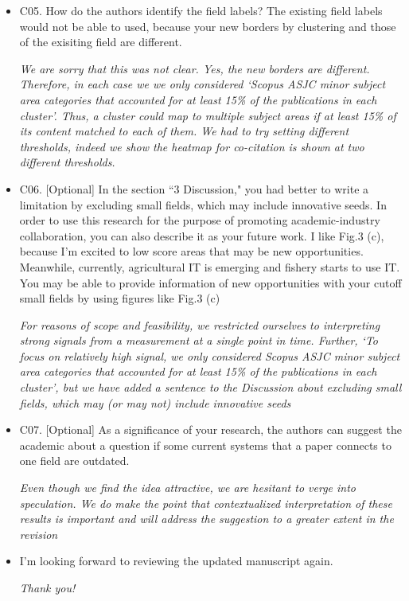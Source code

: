 \documentclass[11pt, oneside]{article}   	%
\begin{document}
\begin{itemize}
\item C05. How do the authors identify the field labels? The existing field labels would not be able to used, because your new borders by clustering and those of the exisiting field are different.

\emph{We are sorry that this was not clear. Yes, the new borders are different. Therefore, in each case we we only considered `Scopus ASJC minor subject area categories that accounted for at least 15\% of the publications in each cluster'. Thus, a cluster could map to multiple subject areas if at least 15\% of its content matched to each of them. We had to try setting different thresholds, indeed we show the heatmap for co-citation is shown at two different thresholds.}

\item C06. [Optional] In the section ``3 Discussion,"  you had better to write a limitation by excluding small fields, which may include innovative seeds. In order to use this research for the purpose of promoting academic-industry collaboration, you can also describe it as your future work. I like Fig.3 (c), because I'm excited to low score areas that may be new opportunities. Meanwhile, currently, agricultural IT is emerging and fishery starts to use IT. You may be able to provide information of new opportunities with your cutoff small fields by using figures like Fig.3 (c)

\emph{For reasons of scope and feasibility, we restricted ourselves to interpreting strong signals from a measurement at a single point in time. Further, `To focus on relatively high signal, we only considered Scopus ASJC minor subject area categories that accounted for at least 15\% of the publications in each cluster', but we have added a sentence to the Discussion about excluding small fields, which may (or may not) include innovative seeds}

\item C07. [Optional] As a significance of your research, the authors can suggest the academic about a question if some current systems that a paper connects to one field are outdated.

\emph{Even though we find the idea attractive, we are hesitant to verge into speculation. We do make the point that contextualized interpretation of these results is important and will address the suggestion to a greater extent in the revision}

\item I'm looking forward to reviewing the updated manuscript again.

\emph{Thank you!}

\end{itemize} 
    
\end{document}

